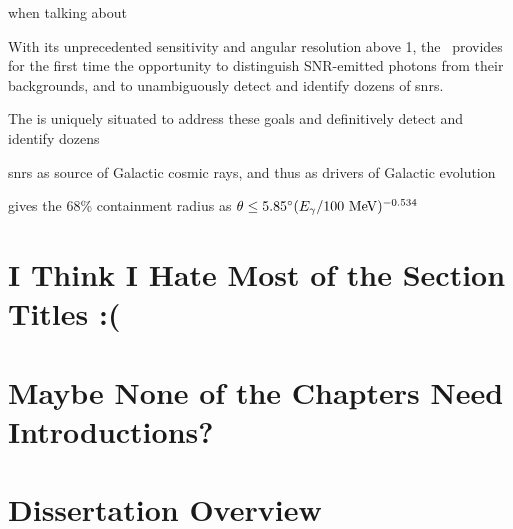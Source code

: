 when talking about \egret{}

With its unprecedented sensitivity and angular resolution above 1\gev, the \lat~provides for the first time the opportunity to distinguish SNR-emitted photons from their backgrounds, and  to unambiguously detect and identify dozens of \glspl{snr}. 

The \lat{} is uniquely situated to address these goals and definitively detect and identify dozens \snrs

snrs as source of Galactic cosmic rays, and thus as drivers of Galactic evolution

\cite{Thomson93} gives the 68\% containment radius as $\theta \leq 5.85^\circ (E_\gamma /100 ~\mathrm{MeV} )^{-0.534}$
\section{I Think I Hate Most of the Section Titles :(}

\section{Maybe None of the Chapters Need Introductions?}

\section{Dissertation Overview}




